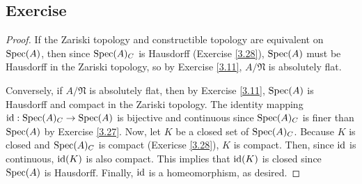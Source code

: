\subsection{Exercise}\label{3.30}

\begin{proof}
If the Zariski topology and constructible topology are equivalent on $\operatorname{Spec}(A)$, then since $\operatorname{Spec}(A)_C$ is Hausdorff (Exercise \ref{3.28}), $\operatorname{Spec}(A)$ must be Hausdorff in the Zariski topology, 
so by Exercise \ref{3.11}, $A/\mathfrak{N}$ is absolutely flat.

Conversely, if $A/\mathfrak{N}$ is absolutely flat, then by Exercise \ref{3.11}, $\operatorname{Spec}(A)$ is Hausdorff and compact in the Zariski topology. The identity mapping
$\operatorname{id} : \operatorname{Spec}(A)_C \to \operatorname{Spec}(A)$ is bijective and continuous since $\operatorname{Spec}(A)_C$ is finer than $\operatorname{Spec}(A)$ by Exercise \ref{3.27}. Now, let $K$ be a closed set of $\operatorname{Spec}(A)_C$. 
Because $K$ is closed and $\operatorname{Spec}(A)_C$ is compact (Exericse \ref{3.28}), $K$ is compact. Then, since $\operatorname{id}$ is continuous, $\operatorname{id}(K)$ is also compact. This implies that 
$\operatorname{id}(K)$ is closed since $\operatorname{Spec}(A)$ is Hausdorff. Finally, $\operatorname{id}$ is a homeomorphism, as desired.
\end{proof}
